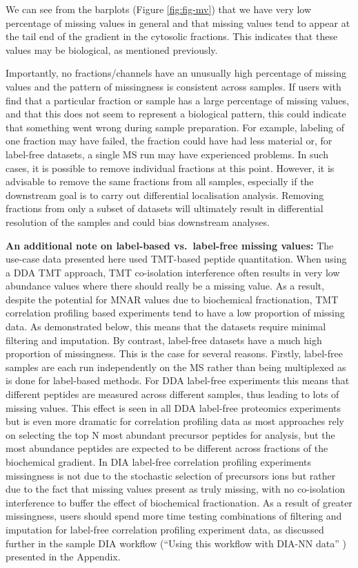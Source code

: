 \documentclass[9pt,a4paper,]{extarticle}
\begin{document}
We can see from the barplots (Figure \ref{fig:fig-mv}) that we have very low
percentage of missing values in general and that missing values tend to appear
at the tail end of the gradient in the cytosolic fractions. This indicates that
these values may be biological, as mentioned previously.

Importantly, no fractions/channels have an unusually high percentage of missing
values and the pattern of missingness is consistent across samples. If users with
find that a particular fraction or sample has a large percentage of missing values,
and that this does not seem to represent a biological pattern, this could indicate
that something went wrong during sample preparation. For example, labeling
of one fraction may have failed, the fraction could have had less material or,
for label-free datasets, a single MS run may have experienced problems. In such
cases, it is possible to remove individual fractions at this point. However, it
is advisable to remove the same fractions from all samples, especially if the
downstream goal is to carry out differential localisation analysis. Removing
fractions from only a subset of datasets will ultimately result in differential
resolution of the samples and could bias downstream analyses.

\textbf{An additional note on label-based vs.~label-free missing values:}
The use-case data presented here used TMT-based peptide quantitation. When using
a DDA TMT approach, TMT co-isolation interference often results in very low
abundance values where there should really be a missing value. As a result,
despite the potential for MNAR values due to biochemical fractionation, TMT
correlation profiling based experiments tend to have a low proportion of missing
data. As demonstrated below, this means that the datasets require minimal filtering
and imputation. By contrast, label-free datasets have a much high proportion of
missingness. This is the case for several reasons. Firstly, label-free samples
are each run independently on the MS rather than being multiplexed as is done
for label-based methods. For DDA label-free experiments this means that different
peptides are measured across different samples, thus leading to lots of missing
values. This effect is seen in all DDA label-free proteomics experiments but is
even more dramatic for correlation profiling data as most approaches rely on
selecting the top N most abundant precursor peptides for analysis, but the most
abundance peptides are expected to be different across fractions of the biochemical
gradient. In DIA label-free correlation profiling experiments missingness is not
due to the stochastic selection of precursors ions but rather due to the fact that
missing values present as truly missing, with no co-isolation interference to
buffer the effect of biochemical fractionation. As a result of greater missingness,
users should spend more time testing combinations of filtering and imputation for
label-free correlation profiling experiment data, as discussed further in the
sample DIA workflow (``Using this workflow with DIA-NN data'' ) presented in the
Appendix.
\end{document}
